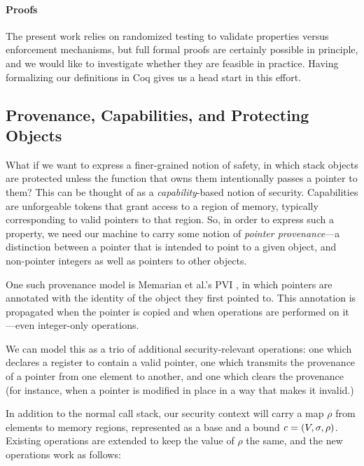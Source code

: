 \documentclass[10pt,conference]{ieeetran}%
\theoremstyle{definition}
\begin{document}
\paragraph*{Proofs}

The present work relies on randomized testing to validate properties versus
enforcement mechanisms, but full formal proofs are certainly possible in principle,
and we would like to investigate whether they are feasible in practice.
Having formalizing our definitions in Coq gives us a head start in this effort.





\appendix

\subsection{Provenance, Capabilities, and Protecting Objects}
\label{app:ptr}

What if we want to express a finer-grained notion of safety, in which
stack objects are protected unless the function that owns them intentionally
passes a pointer to them? This can be thought of as a {\it capability}-based
notion of security. Capabilities are unforgeable tokens that grant access to
a region of memory, typically corresponding to valid pointers to that region.
So, in order to express such a property, we need our machine to carry some notion
of {\it pointer provenance}---a distinction between a pointer that is intended to
point to a given object, and non-pointer integers as well as pointers to other objects.

One such provenance model is Memarian et al.'s PVI \cite{provenance}, in which pointers are
annotated with the identity of the object they first pointed to. This annotation is
propagated when the pointer is copied and when operations are performed on it---even
integer-only operations.

We can model this as a trio of additional security-relevant operations: one which
declares a register to contain a valid pointer, one which transmits the provenance
of a pointer from one element to another, and one which clears the provenance
(for instance, when a pointer is modified in place in a way that makes it invalid.)

In addition to the normal call stack, our security context will carry a map \(\rho\) from
elements to memory regions, represented as a base and a bound \(\mathit{c} = (V, \sigma, \rho)\).
Existing operations are extended to keep the value of \(\rho\) the same, and the new operations
work as follows:
\end{document}
